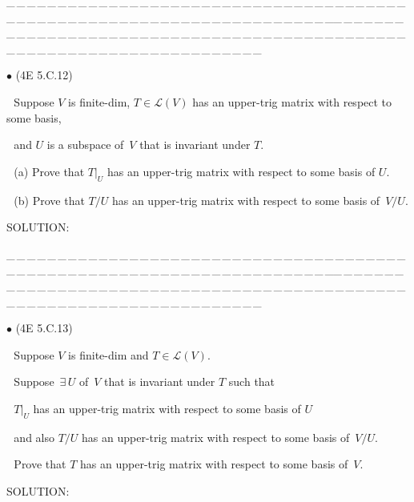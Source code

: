 \documentclass[a4paper, 11pt, UTF8]{article}
\def\Lm{\mathcal{L}}
\begin{document}
\begin{large}
\par
{\tiny \_\,\_\,\_\,\_\,\_\,\_\,\_\,\_\,\_\,\_\,\_\,\_\,\_\,\_\,\_\,\_\,\_\,\_\,\_\,\_\,\_\,\_\,\_\,\_\,\_\,\_\,\_\,\_\,\_\,\_\,\_\,\_\,\_\,\_\,\_\,\_\,\_\,\_\,\_\,\_\,\_\,\_\,\_\,\_\,\_\,\_\,\_\,\_\,\_\,\_\,\_\,\_\,\_\,\_\,\_\,\_\,\_\,\_\,\_\,\_\,\_\,\_\,\_\,\_\,\_\,\_\,\_\,\_\,\_\,\_\,\_\_\,\_\,\_\,\_\,\_\,\_\,\_\,\_\,\_\,\_\,\_\,\_\,\_\,\_\,\_\,\_\,\_\,\_\,\_\,\_\,\_\,\_\,\_\,\_\,\_\,\_\,\_\,\_\,\_\,\_\,\_\,\_\,\_\,\_\,\_\,\_\,\_\,\_\,\_\,\_\,\_\,\_\,\_\,\_\,\_\,\_\,\_\,\_\,\_\,\_\,\_\,\_\,\_\,\_\,\_\,\_\,\_\,\_\,\_\,\_\,\_\,\_\,\_\,\_\,\_\,\_\,\_\,\_\,\_\,\_\,\_}\par

{\small $\bullet$} (\normalsize{4E 5.C.12})\par\,\, {\timessl\Large 
Suppose $V$ is finite-dim, $T\in \Lm(V)$ has an upper-trig matrix with respect to some basis,}\par\,\,
{\timessl\Large and $U$ is a subspace of \,$V$ that is invariant under $T$.
}\par\,\,
(a) {\timessl\Large
Prove that $T|_U$ has an upper-trig matrix with respect to some basis of $U$.}\par\,\,
(b) {\timessl\Large
Prove that $T/U$ has an upper-trig matrix with respect to some basis of \,$V/U$.
}\par
{\timesbf S\footnotesize{OLUTION:}}\par\quad

\par
{\tiny \_\,\_\,\_\,\_\,\_\,\_\,\_\,\_\,\_\,\_\,\_\,\_\,\_\,\_\,\_\,\_\,\_\,\_\,\_\,\_\,\_\,\_\,\_\,\_\,\_\,\_\,\_\,\_\,\_\,\_\,\_\,\_\,\_\,\_\,\_\,\_\,\_\,\_\,\_\,\_\,\_\,\_\,\_\,\_\,\_\,\_\,\_\,\_\,\_\,\_\,\_\,\_\,\_\,\_\,\_\,\_\,\_\,\_\,\_\,\_\,\_\,\_\,\_\,\_\,\_\,\_\,\_\,\_\,\_\,\_\,\_\_\,\_\,\_\,\_\,\_\,\_\,\_\,\_\,\_\,\_\,\_\,\_\,\_\,\_\,\_\,\_\,\_\,\_\,\_\,\_\,\_\,\_\,\_\,\_\,\_\,\_\,\_\,\_\,\_\,\_\,\_\,\_\,\_\,\_\,\_\,\_\,\_\,\_\,\_\,\_\,\_\,\_\,\_\,\_\,\_\,\_\,\_\,\_\,\_\,\_\,\_\,\_\,\_\,\_\,\_\,\_\,\_\,\_\,\_\,\_\,\_\,\_\,\_\,\_\,\_\,\_\,\_\,\_\,\_\,\_\,\_}\par

{\small $\bullet$} (\normalsize{4E 5.C.13})\par\,\, {\timessl\Large 
Suppose $V$ is finite-dim and $T\in \Lm(V)$.}\par\,\,
{\timessl\Large Suppose $\,\exists\,U$ of \,$V$ that is invariant under $T$ such that}\par\,\,
{\timessl\Large $T|_U$ has an upper-trig matrix with respect to some basis of $U$}\par\,\,
{\timessl\Large and also $T/U$ has an upper-trig matrix with respect to some basis of \,$V/U$.}\par\,\,
{\timessl\Large Prove that $T$ has an upper-trig matrix with respect to some basis of \,$V$.
}\par
{\timesbf S\footnotesize{OLUTION:}}\par\quad


\end{large}
\end{document}

